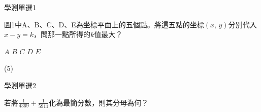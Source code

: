 \begin{QUESTIONS}
    \begin{QUESTION}
        \begin{ExamInfo}{84}{學測}{單選}{1}
        \end{ExamInfo}
        \begin{ExamAnsRateInfo}{}{}{}{}
        \end{ExamAnsRateInfo}
        \begin{QBODY}
            圖1中A、B、C、D、E為坐標平面上的五個點。將這五點的坐標$\left( x,\,y \right)$分別代入$x-y=k$，問那一點所得的$k$值最大？
            \begin{QOPS}
                \QOP $A$
                \QOP $B$
                \QOP $C$
                \QOP $D$
                \QOP $E$
            \end{QOPS}
        \end{QBODY}
        \begin{QFROMS}
        \end{QFROMS}
        \begin{QTAGS}\end{QTAGS}
        \begin{QANS}
            (5)
        \end{QANS}
        \begin{QSOLLIST}
        \end{QSOLLIST}
        \begin{QEMPTYSPACE}
        \end{QEMPTYSPACE}
    \end{QUESTION}
    \begin{QUESTION}
        \begin{ExamInfo}{84}{學測}{單選}{2}
        \end{ExamInfo}
        \begin{ExamAnsRateInfo}{}{}{}{}
        \end{ExamAnsRateInfo}
        \begin{QBODY}
            若將$\frac{1}{4369}+\frac{1}{5911}$化為最簡分數，則其分母為何？
            \begin{QOPS}
            \end{QOPS}            
        \end{QBODY}
        \begin{QFROMS}
        \end{QFROMS}

\end{QUESTION}
\end{QUESTIONS}
